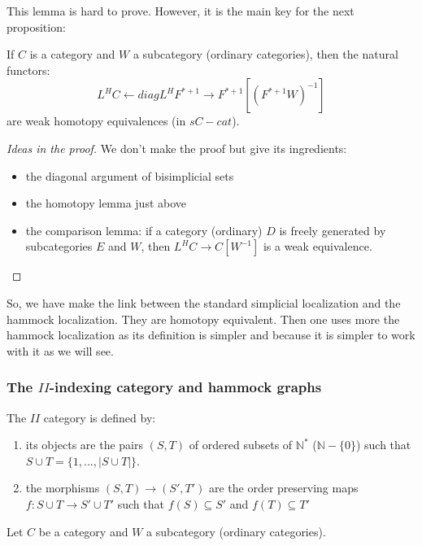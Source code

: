 This lemma is hard to prove. However, it is the main key for the next proposition:

\begin{prop}
If $C$ is a category and $W$ a subcategory (ordinary categories), then the natural functors:
\begin{equation}
L^H C \leftarrow diag L^H F^{*+1} \rightarrow F^{*+1} [(F^{*+1}W)^{-1}]
\end{equation}
are weak homotopy equivalences (in $sC-cat$).
\end{prop}

\begin{proof}[Ideas in the proof]
We don't make the proof but give its ingredients:
\begin{itemize}
\item the diagonal argument of bisimplicial sets
\item the homotopy lemma just above
\item the comparison lemma: if a category (ordinary) $D$ is freely generated by subcategories $E$ and $W$, then $L^H C \rightarrow C[W^{-1}]$ is a weak equivalence.
\end{itemize}
\end{proof}

So, we have make the link between the standard simplicial localization and the hammock localization. They are homotopy equivalent. Then one uses more the hammock localization as its definition is simpler and because it is simpler to work with it as we will see.

\subsubsection{The $II$-indexing category and hammock graphs}

The $II$ category is defined by:
\begin{enumerate}
\item its objects are the pairs $(S,T)$ of ordered subsets of $\mathbb{N}^*$ ($\mathbb{N}-\{0\}$) such that $S \cup T= \{1,...,|S \cup T|\}$.
\item the morphisms $(S,T) \rightarrow (S',T')$ are the order preserving maps $f: S \cup T \rightarrow S' \cup T'$ such that $f(S) \subseteq S'$ and $f(T) \subseteq T'$
\end{enumerate}

Let $C$ be a category and $W$ a subcategory (ordinary categories).

